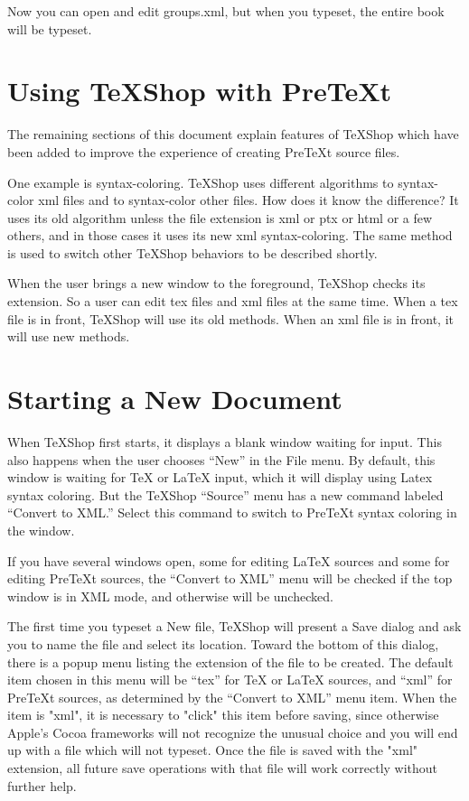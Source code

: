\documentclass[11pt, oneside]{article}   	%
\begin{document}
Now you can open and edit groups.xml, but when you typeset, the entire book will be typeset.




\section{Using TeXShop with PreTeXt}

The remaining sections of this document explain features of TeXShop which have been added to improve the experience of creating PreTeXt source files. 

One example is syntax-coloring. TeXShop uses different algorithms to syntax-color xml files and to syntax-color other files. How does it know the difference? It uses its old algorithm unless the file extension is xml or ptx or html or a few others, and in those cases it uses its new xml syntax-coloring. The same method is used to switch  other TeXShop behaviors to be described shortly.

When the user brings a new window to the foreground, TeXShop checks its extension. So a user can edit tex files and xml files at the same time. When a tex file is in front, TeXShop will use its old methods. When an xml file is in front, it will use new methods.

\section{Starting a New Document}

When TeXShop first starts, it  displays a blank window waiting for input. This also happens when the user chooses ``New'' in the File menu. By default, this window is waiting for TeX or LaTeX input, which it will display using Latex syntax coloring. But the TeXShop ``Source'' menu has a new command labeled ``Convert to XML.'' Select this command to switch to PreTeXt syntax coloring in the window. 

If you have several windows open, some for editing LaTeX sources and some for editing PreTeXt sources, the ``Convert to XML'' menu will be checked if the top window is in XML mode, and otherwise will be unchecked.

The first time you typeset a New file, TeXShop will  present a Save dialog and ask you to name the file and select its location. Toward the bottom of this dialog, there is a popup menu listing the extension of the file to be created. The default item chosen in this menu will be ``tex'' for TeX or LaTeX sources, and ``xml'' for PreTeXt sources, as determined by the ``Convert to XML'' menu item.  When the item is "xml",  it is necessary to "click" this item before saving, since otherwise Apple's Cocoa frameworks will not recognize the unusual choice and you will end up with a file which will not typeset.  Once the file is saved  with the "xml" extension, all future save operations with that file will work correctly without further help.
\end{document}
